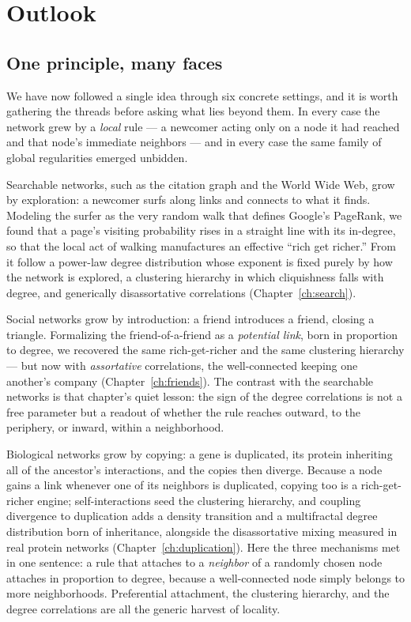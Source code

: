 \chapter{Outlook}
\label{ch:outlook}

\section{One principle, many faces}

We have now followed a single idea through six concrete settings, and it is worth
gathering the threads before asking what lies beyond them. In every case the
network grew by a \emph{local} rule --- a newcomer acting only on a node it had
reached and that node's immediate neighbors --- and in every case the same family
of global regularities emerged unbidden.

Searchable networks, such as the citation graph and the World Wide Web, grow by
exploration: a newcomer surfs along links and connects to what it finds. Modeling
the surfer as the very random walk that defines Google's PageRank, we found that a
page's visiting probability rises in a straight line with its in-degree, so that
the local act of walking manufactures an effective ``rich get richer.'' From it
follow a power-law degree distribution whose exponent is fixed purely by how the
network is explored, a clustering hierarchy in which cliquishness falls with
degree, and generically disassortative correlations
(Chapter~\ref{ch:search}).

Social networks grow by introduction: a friend introduces a friend, closing a
triangle. Formalizing the friend-of-a-friend as a \emph{potential link}, born in
proportion to degree, we recovered the same rich-get-richer and the same
clustering hierarchy --- but now with \emph{assortative} correlations, the
well-connected keeping one another's company (Chapter~\ref{ch:friends}). The
contrast with the searchable networks is that chapter's quiet lesson: the sign of
the degree correlations is not a free parameter but a readout of whether the rule
reaches outward, to the periphery, or inward, within a neighborhood.

Biological networks grow by copying: a gene is duplicated, its protein inheriting
all of the ancestor's interactions, and the copies then diverge. Because a node
gains a link whenever one of its neighbors is duplicated, copying too is a
rich-get-richer engine; self-interactions seed the clustering hierarchy, and
coupling divergence to duplication adds a density transition and a multifractal
degree distribution born of inheritance, alongside the disassortative mixing
measured in real protein networks (Chapter~\ref{ch:duplication}). Here the three
mechanisms met in one sentence: a rule that attaches to a \emph{neighbor} of a
randomly chosen node attaches in proportion to degree, because a well-connected
node simply belongs to more neighborhoods. Preferential attachment, the
clustering hierarchy, and the degree correlations are all the generic harvest of
locality.

